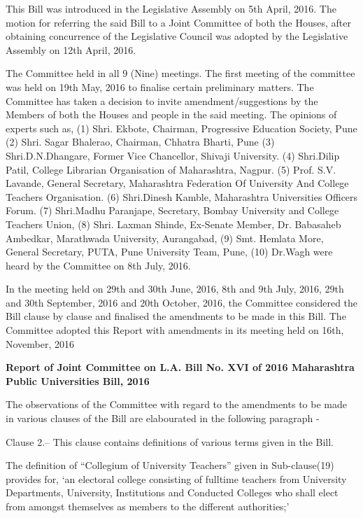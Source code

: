 \documentclass[reprint]{mhact}
\begin{document}
{      This Bill was introduced in the Legislative Assembly on 5th
      April, 2016. The motion for referring the said Bill to a Joint
      Committee of both the Houses, after obtaining concurrence of the
      Legislative Council was adopted by the Legislative Assembly on
      12th April, 2016.

      The Committee held in all 9 (Nine) meetings. The first meeting
      of the committee was held on 19th May, 2016 to finalise certain
      preliminary matters. The Committee has taken a decision to
      invite amendment/suggestions by the Members of both the Houses
      and people in the said meeting. The opinions of experts such as,
      (1) Shri. Ekbote, Chairman, Progressive Education Society, Pune
      (2) Shri. Sagar Bhalerao, Chairman, Chhatra Bharti, Pune (3)
      Shri.D.N.Dhangare, Former Vice Chancellor, Shivaji University.
      (4) Shri.Dilip Patil, College Librarian Organisation of
      Maharashtra, Nagpur. (5) Prof. S.V. Lavande, General
      Secretary, Maharashtra Federation Of University And College
      Teachers Organisation. (6) Shri.Dinesh Kamble, Maharashtra
      Universities Officers Forum. (7) Shri.Madhu Paranjape,
      Secretary, Bombay University and College Teachers Union, (8)
      Shri. Laxman Shinde, Ex-Senate Member, Dr. Babasaheb Ambedkar,
      Marathwada University, Aurangabad, (9) Smt. Hemlata More,
      General Secretary, PUTA, Pune University Team, Pune, (10)
      Dr.Wagh were heard by the Committee on 8th July, 2016.

      In the meeting held on 29th and 30th June, 2016, 8th and 9th
      July, 2016, 29th and 30th September, 2016 and 20th October,
      2016, the Committee considered the Bill clause by clause and
      finalised the amendments to be made in this Bill. The Committee
      adopted this Report with amendments in its meeting held on 16th,
      November, 2016

      \begin{center}
        \textbf{Report of Joint Committee on L.A. Bill No. XVI of 2016
          Maharashtra Public Universities Bill, 2016}
      \end{center}
      The observations of the Committee with regard to the amendments
      to be made in various clauses of the Bill are elabourated in the
      following paragraph -

      Clause 2.– This clause contains definitions of various terms
      given in the Bill.

      The definition of ``Collegium of University Teachers'' given in
      Sub-clause(19) provides for, `an electoral college consisting
      of fulltime teachers from University Departments, University,
      Institutions and Conducted Colleges who shall elect from amongst
      themselves as members to the different authorities;'

}
\end{document}
